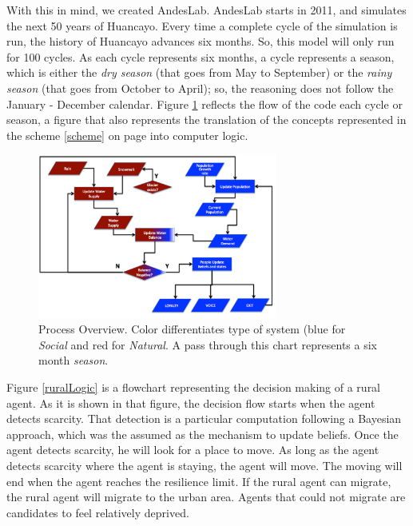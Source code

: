 \documentclass{article}
\begin{document}
With this in mind, we created AndesLab. AndesLab starts in 2011, and simulates the next 50 years of Huancayo. Every time a complete cycle of the simulation is run, the history of Huancayo advances six months.  So, this model will only run for 100 cycles. As each cycle represents six months, a cycle represents a season, which is either the \emph{dry season} (that goes from May to September) or the \emph{rainy season} (that goes from October to April); so, the reasoning does not follow the January - December calendar. Figure \ref{flow1} reflects the flow of the code each cycle or season, a figure that also represents the translation of the concepts represented in the scheme \ref{scheme} on page \pageref{scheme} into computer logic. 

\begin{figure}[ht]
\centering
  \includegraphics[width=0.7\textwidth]{flow1}
  \caption[Process Overview]{Process Overview. Color differentiates type of system (blue for  \emph{Social} and red for \emph{Natural}. A pass through this chart represents a six month \emph{season}.}
  \label{flow1}
\end{figure}

Figure \ref{ruralLogic} is a flowchart representing the decision making of a rural agent. As it is shown in that figure, the decision flow starts when the agent detects scarcity. That detection is a particular computation following a Bayesian approach, which was the assumed as the mechanism to update beliefs. Once the agent detects scarcity, he will look for a place to move. As long as the agent detects scarcity where the agent is staying, the agent will move. The moving will end when the agent reaches the resilience limit. If the rural agent can migrate, the rural agent will migrate to the urban area. Agents that could not migrate are candidates to feel relatively deprived.
\end{document}
